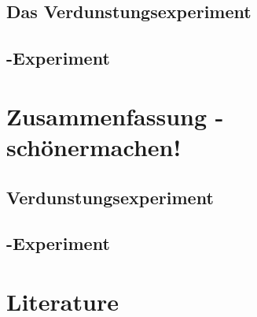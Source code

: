 \documentclass[oneside, a4paper, DIV=11]{scrartcl}
\begin{document}
\subsection{Das Verdunstungsexperiment}
\label{res:eva}
\subsection{\COT-Experiment}
\label{res:cot}

\section{Zusammenfassung - schönermachen!}
\label{sec:con}
\subsection{Verdunstungsexperiment}
\label{con:eva}
\subsection{\COT-Experiment}
\label{con:cot}

\section{Literature}
\label{sec:lit}
\end{document}
